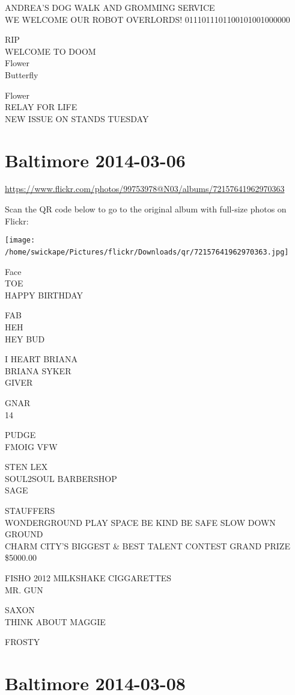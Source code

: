 \documentclass[10pt,letterpaper]{article}
\begin{document}
ANDREA'S DOG WALK AND GROMMING SERVICE\\
WE WELCOME OUR ROBOT OVERLORDS!  0111011101100101001000000

RIP\\
WELCOME TO DOOM\\
Flower\\
Butterfly

Flower\\
RELAY FOR LIFE\\
NEW ISSUE ON STANDS TUESDAY
\

\section*{Baltimore 2014-03-06}

\url{https://www.flickr.com/photos/99753978@N03/albums/72157641962970363}

Scan the QR code below to go to the original album with full-size photos on Flickr:

\texttt{[image: /home/swickape/Pictures/flickr/Downloads/qr/72157641962970363.jpg]}
\

Face\\
TOE\\
HAPPY BIRTHDAY

FAB\\
HEH\\
HEY BUD

I HEART BRIANA\\
BRIANA SYKER\\
GIVER

GNAR\\
14

PUDGE\\
FMOIG VFW

STEN LEX\\
SOUL2SOUL BARBERSHOP\\
SAGE

STAUFFERS\\
WONDERGROUND PLAY SPACE BE KIND BE SAFE SLOW DOWN\\
GROUND\\
CHARM CITY'S BIGGEST \& BEST TALENT CONTEST GRAND PRIZE \$5000.00

FISHO 2012 MILKSHAKE CIGGARETTES\\
MR. GUN

SAXON\\
THINK ABOUT MAGGIE

FROSTY
\

\section*{Baltimore 2014-03-08}
\end{document}
